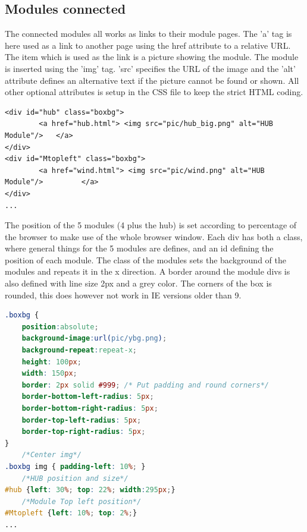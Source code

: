 \subsection{Modules connected}
The connected modules all works as links to their module pages. The 'a' tag is here used as a link to another page using the href attribute to a relative URL. The item which is used as the link is a picture showing the module. The module is inserted using the 'img' tag. 'src' specifies the URL of the image and the 'alt' attribute defines an alternative text if the picture cannot be found or shown. All other optional attributes is setup in the CSS file to keep the strict HTML coding.
\begin{lstlisting}
<div id="hub" class="boxbg">
		<a href="hub.html"> <img src="pic/hub_big.png" alt="HUB Module"/> 	</a>
</div>
<div id="Mtopleft" class="boxbg">
		<a href="wind.html"> <img src="pic/wind.png" alt="HUB Module"/> 		</a>
</div>
...
\end{lstlisting}
The position of the 5 modules (4 plus the hub) is set according to percentage of the browser to make use of the whole browser window. Each div has both a class, where general things for the 5 modules are defines, and an id defining the position of each module. The class of the modules sets the background of the modules and repeats it in the x direction. A border around the module divs is also defined with line size 2px and a grey color. The corners of the box is rounded, this does however not work in IE versions older than 9.
\begin{lstlisting}[language=CSS]
.boxbg {
	position:absolute;
	background-image:url(pic/ybg.png);
	background-repeat:repeat-x;
	height: 100px;
	width: 150px;
	border: 2px solid #999;	/* Put padding and round corners*/
	border-bottom-left-radius: 5px;
	border-bottom-right-radius: 5px;
	border-top-left-radius: 5px;
	border-top-right-radius: 5px;
}
	/*Center img*/
.boxbg img { padding-left: 10%; }
	/*HUB position and size*/
#hub {left: 30%; top: 22%; width:295px;}
	/*Module Top left position*/
#Mtopleft {left: 10%; top: 2%;}
...
\end{lstlisting}

